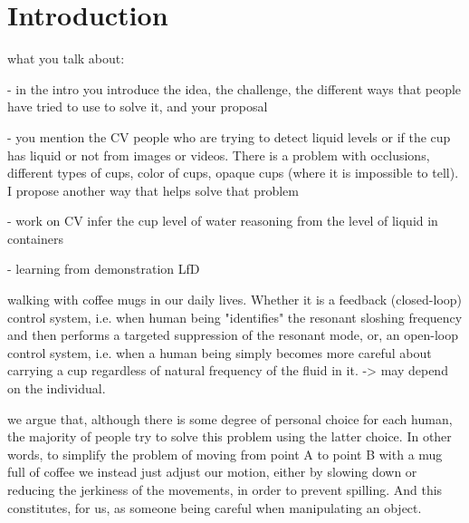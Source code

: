 \section{Introduction}

what you talk about:

- in the intro you introduce the idea, the challenge, the different ways that people have tried to use to solve it, and your proposal

- you mention the CV people who are trying to detect liquid levels or if the cup has liquid or not from images or videos. There is a problem with occlusions, different types of cups, color of cups, opaque cups (where it is impossible to tell). I propose another way that helps solve that problem

- work on CV
\cite{yu_fill_2015} infer the cup level of water
\cite{mottaghi_see_2017} reasoning from the level of liquid in containers

- learning from demonstration
\cite{santina_learning_2019} LfD

\cite{mayer_walking_2012} walking with coffee mugs in our daily lives. Whether it is a feedback (closed-loop) control system, i.e. when human being "identifies" the resonant sloshing frequency and then performs a targeted suppression of the resonant mode, or, an open-loop control system, i.e. when a human being simply becomes more careful about carrying a cup regardless of natural frequency of the fluid in it. -> may depend on the individual.

we argue that, although there is some degree of personal choice for each human, the majority of people try to solve this problem using the latter choice. In other words, to simplify the problem of moving from point A to point B with a mug full of coffee we instead just adjust our motion, either by slowing down or reducing the jerkiness of the movements, in order to prevent spilling. And this constitutes, for us, as someone being careful when manipulating an object. 


